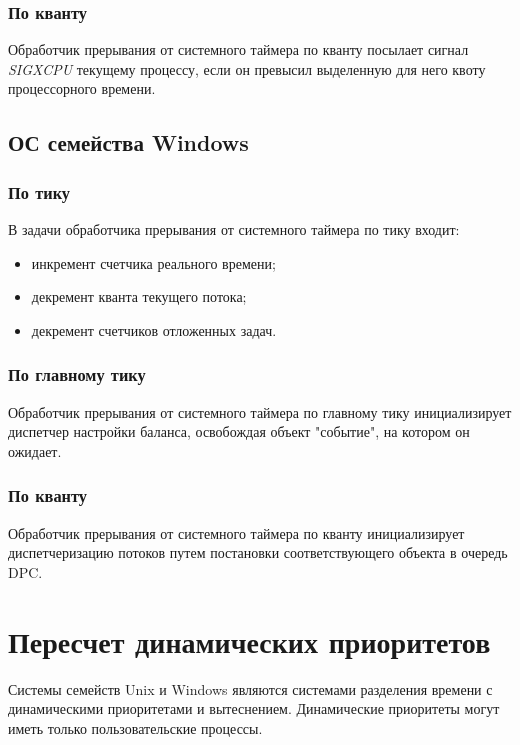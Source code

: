 \subsection{По кванту}

Обработчик прерывания от системного таймера по кванту посылает сигнал \textit{SIGXCPU} текущему процессу, если он превысил выделенную для него квоту процессорного времени.

\section{ОС семейства Windows}

\subsection{По тику}

В задачи обработчика прерывания от системного таймера по тику входит:

\begin{itemize}
	\item инкремент счетчика реального времени;
	\item декремент кванта текущего потока;
	\item декремент счетчиков отложенных задач.
\end{itemize}

\subsection{По главному тику}

Обработчик прерывания от системного таймера по главному тику инициализирует диспетчер настройки баланса, освобождая объект "событие"{}, на котором он ожидает.

\subsection{По кванту}

Обработчик прерывания от системного таймера по кванту инициализирует диспетчеризацию потоков путем постановки соответствующего объекта в очередь DPC.

\chapter{Пересчет динамических приоритетов}

Системы семейств Unix и Windows являются системами разделения времени с динамическими приоритетами и вытеснением. Динамические приоритеты могут иметь только пользовательские процессы.

